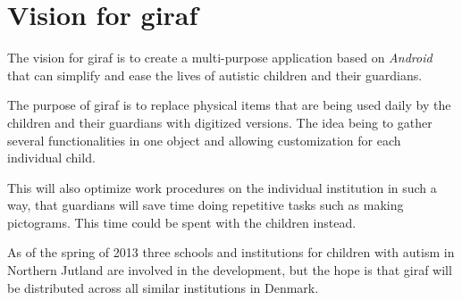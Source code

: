 \section{Vision for \acs{giraf}}
The vision for \ac{giraf} is to create a multi-purpose application based on \emph{Android} that can simplify and ease the lives of autistic children and their guardians.

The purpose of \ac{giraf} is to replace physical items that are being used daily by the children and their guardians with digitized versions. The idea being to gather several functionalities in one object and allowing customization for each individual child.

This will also optimize work procedures on the individual institution in such a way, that guardians will save time doing repetitive tasks such as making pictograms. This time could be spent with the children instead.

As of the spring of 2013 three schools and institutions for children with autism in Northern Jutland are involved in the development, but the hope is that \ac{giraf} will be distributed across all similar institutions in Denmark.

